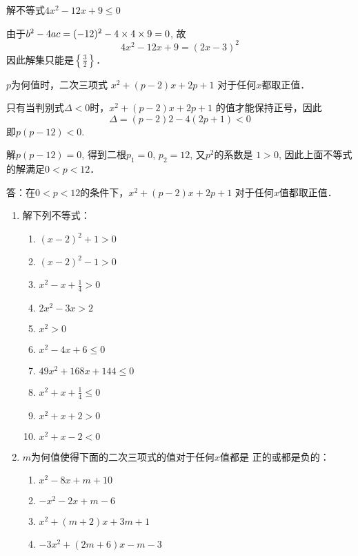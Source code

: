 \begin{example}
解不等式$4x^2-12x+9\le 0$
\end{example}

\begin{solution}
    由于$b^2-4ac=(-12)^2-4\times4\times9=0$, 故
\[4x^2-12x+9=(2x-3)^2\]
因此解集只能是$\left\{\frac{3}{2}\right\}$．
\end{solution}


\begin{example}
    $p$为何值时，二次三项式
$x^2+(p-2)x+2p+1$
对于任何$x$都取正值．
\end{example}


\begin{solution}
    只有当判别式$\Delta<0$时，$x^2+(p-2)x+2p+1$
的值才能保持正号，因此
$$\Delta=(p-2)2-4(2p+1)<0$$
即$p(p-12)<0$.

解$p(p-12)=0$, 得到二根$p_1=0$, $p_2=12$, 又$p^2$的系数是
$1>0$, 因此上面不等式的解满足$0<p<12$．

答：在$0<p<12$的条件下，$x^2+(p-2)x+2p+1$
对于任何$x$值都取正值．
\end{solution}


\begin{ex}
\begin{enumerate}
    \item 解下列不等式：
\begin{multicols}{2}
\begin{enumerate}
    \item $(x-2)^2+1>0$
    \item $(x-2)^2-1>0$
    \item $x^2-x+\frac{1}{4}>0$
    \item $2x^2-3x>2$
    \item $x^2>0$
    \item $x^2-4x+6\le 0$
    \item $49x^2+168x+144\le 0$
    \item $x^2+x+\frac{1}{4}\le 0$
    \item $x^2+x+2>0$
    \item $x^2+x-2<0$
\end{enumerate}
\end{multicols}
    \item $m$为何值使得下面的二次三项式的值对于任何$x$值都是
    正的或都是负的：
\begin{multicols}{2}
\begin{enumerate}
    \item $x^2-8x+m+10$
    \item $-x^2-2x+m-6$
    \item $x^2+(m+2)x+3m+1$
    \item $-3x^2+(2m+6)x-m-3$
\end{enumerate}
\end{multicols}
\end{enumerate}    
\end{ex}

